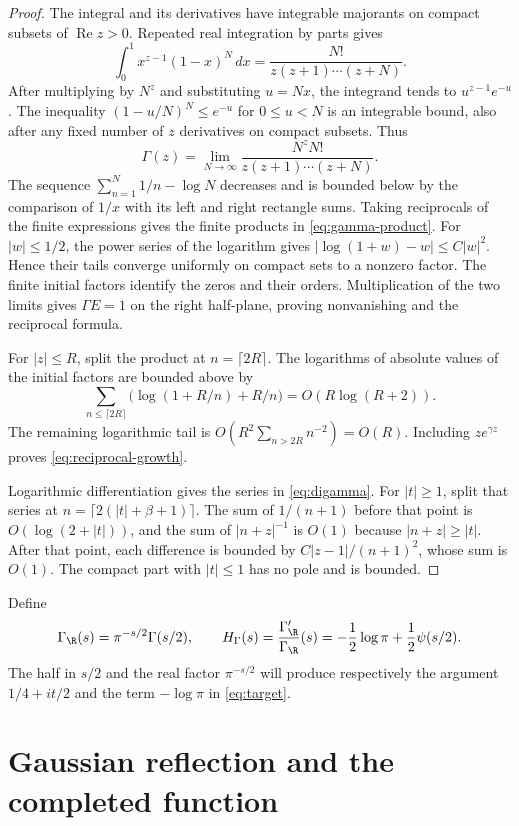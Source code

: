 \begin{proof}
The integral and its derivatives have integrable majorants on compact
subsets of $\operatorname{Re}z>0$.
Repeated real integration by parts gives
\[
 \int_0^1 x^{z-1}(1-x)^N\,dx
       =\frac{N!}{z(z+1)\cdots(z+N)}.
\]
After multiplying by $N^z$ and substituting $u=Nx$, the integrand tends to
$u^{z-1}e^{-u}$.  The inequality $(1-u/N)^N\leq e^{-u}$ for $0\leq u<N$
is an integrable bound, also after any fixed number of $z$ derivatives
on compact subsets.  Thus
\[
 \Gamma(z)=\lim_{N\to\infty}
        \frac{N^zN!}{z(z+1)\cdots(z+N)}.
\]
The sequence $\sum_{n=1}^N1/n-\log N$ decreases and is bounded below
by the comparison of $1/x$ with its left and right rectangle sums.
Taking reciprocals of the finite expressions gives the finite products
in \eqref{eq:gamma-product}.
For $|w|\leq1/2$, the power series of the logarithm gives
$|\log(1+w)-w|\leq C|w|^2$.
Hence their tails converge uniformly on compact sets to a nonzero factor.
The finite initial factors identify the zeros and their orders.
Multiplication of the two limits gives $\Gamma E=1$ on the right half-plane,
proving nonvanishing and the reciprocal formula.

For $|z|\leq R$, split the product at $n=\lceil2R\rceil$.
The logarithms of absolute values of the initial factors are bounded above by
\[
 \sum_{n\leq\lceil2R\rceil}
       \bigl(\log(1+R/n)+R/n\bigr)=O(R\log(R+2)).
\]
The remaining logarithmic tail is $O(R^2\sum_{n>2R}n^{-2})=O(R)$.
Including $z e^{\gamma z}$ proves \eqref{eq:reciprocal-growth}.

Logarithmic differentiation gives the series in \eqref{eq:digamma}.
For $|t|\geq1$, split that series at $n=\lceil2(|t|+\beta+1)\rceil$.
The sum of $1/(n+1)$ before that point is $O(\log(2+|t|))$,
and the sum of $|n+z|^{-1}$ is $O(1)$ because $|n+z|\geq|t|$.
After that point, each difference is bounded by $C|z-1|/(n+1)^2$,
whose sum is $O(1)$.
The compact part with $|t|\leq1$ has no pole and is bounded.
\end{proof}

Define
\begin{equation}
 \Gamma_{\R}(s)=\pi^{-s/2}\Gamma(s/2),\qquad
 H_\Gamma(s)=\frac{\Gamma_{\R}'}{\Gamma_{\R}}(s)
          =-\frac12\log\pi+\frac12\psi(s/2).
 \label{eq:gamma-real}
\end{equation}
The half in $s/2$ and the real factor $\pi^{-s/2}$ will produce respectively
the argument $1/4+it/2$ and the term $-\log\pi$ in \eqref{eq:target}.

\section{Gaussian reflection and the completed function}
\label{sec:theta}

